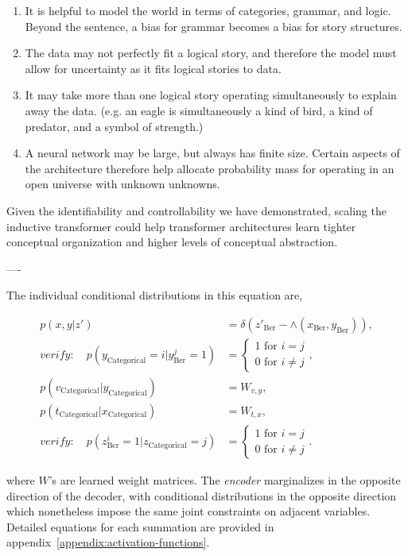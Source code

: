 \begin{enumerate}
    \item It is helpful to model the world in terms of categories, grammar, and logic. Beyond the sentence, a bias for grammar becomes a bias for story structures.
    \item The data may not perfectly fit a logical story, and therefore the model must allow for uncertainty as it fits logical stories to data.
    \item It may take more than one logical story operating simultaneously to explain away the data.  (e.g. an eagle is simultaneously a kind of bird, a kind of predator, and a symbol of strength.)
    \item A neural network may be large, but always has finite size. Certain aspects of the architecture therefore help allocate probability mass for operating in an open universe with unknown unknowns.
\end{enumerate}

Given the identifiability and controllability we have demonstrated, scaling the inductive transformer could help transformer architectures learn tighter conceptual organization and higher levels of conceptual abstraction.

----

The individual conditional distributions in this equation are,

\begingroup
\addtolength{\jot}{1em}
\begin{align}
    p(x, y|z') &= \delta(z'_{\text{Ber}}-\land(x_{\text{Ber}}, y_{\text{Ber}})), \\
    verify: \quad  p(y_{\text{Categorical}}=i|y^j_{\text{Ber}}=1) &= \begin{cases}1 \text{ for } i=j \\ 0 \text{ for } i\neq j \end{cases}, \\
    p(v_{\text{Categorical}}|y_{\text{Categorical}}) &= W_{v,y}, \\
    p(t_{\text{Categorical}}|x_{\text{Categorical}}) &= W_{t,x}, \\
    verify : \quad p(z^i_{\text{Ber}}=1|z_{\text{Categorical}}=j) &= \begin{cases}1 \text{ for } i = j \\ 0 \text{ for } i \neq j \end{cases}.
\end{align} 
\endgroup

where $W$'s are learned weight matrices.  The \emph{encoder} marginalizes in the opposite direction of the decoder, with conditional distributions in the opposite direction which nonetheless impose the same joint constraints on adjacent variables.  Detailed equations for each summation are provided in appendix~\ref{appendix:activation-functions}.


